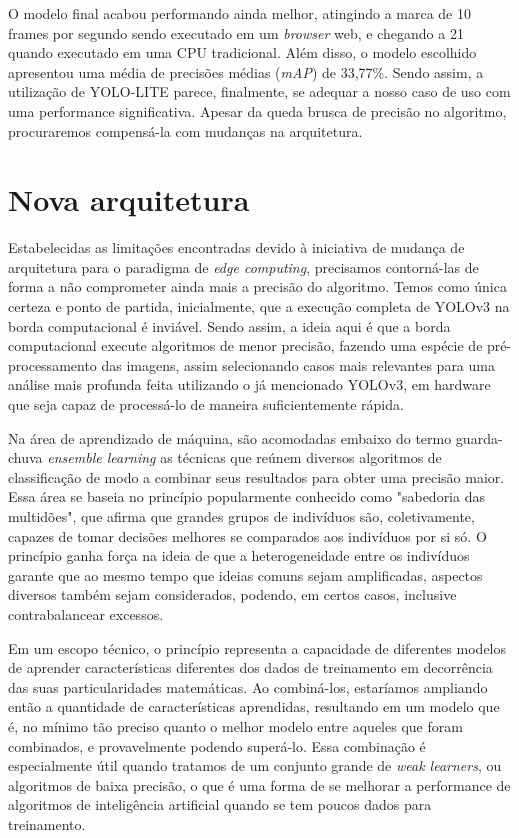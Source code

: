 \documentclass[]{politex}
\begin{document}
O modelo final acabou performando ainda melhor, atingindo a marca de 10 frames por segundo sendo executado em um \textit{browser} web, e chegando a 21 quando executado em uma CPU tradicional. Além disso, o modelo escolhido apresentou uma média de precisões médias (\textit{mAP}) de 33,77\%. Sendo assim, a utilização de YOLO-LITE parece, finalmente, se adequar a nosso caso de uso com uma performance significativa. Apesar da queda brusca de precisão no algoritmo, procuraremos compensá-la com mudanças na arquitetura.

\section{Nova arquitetura}

Estabelecidas as limitações encontradas devido à iniciativa de mudança de arquitetura para o paradigma de \textit{edge computing}, precisamos contorná-las de forma a não comprometer ainda mais a precisão do algoritmo. Temos como única certeza e ponto de partida, inicialmente, que a execução completa de YOLOv3 na borda computacional é inviável. Sendo assim, a ideia aqui é que a borda computacional execute algoritmos de menor precisão, fazendo uma espécie de pré-processamento das imagens, assim selecionando casos mais relevantes para uma análise mais profunda feita utilizando o já mencionado YOLOv3, em hardware que seja capaz de processá-lo de maneira suficientemente rápida.

Na área de aprendizado de máquina, são acomodadas embaixo do termo guarda-chuva \textit{ensemble learning} as técnicas que reúnem diversos algoritmos de classificação de modo a combinar seus resultados para obter uma precisão maior. Essa área se baseia no princípio popularmente conhecido como "sabedoria das multidões", que afirma que grandes grupos de indivíduos são, coletivamente, capazes de tomar decisões melhores se comparados aos indivíduos por si só. O princípio ganha força na ideia de que a heterogeneidade entre os indivíduos garante que ao mesmo tempo que ideias comuns sejam amplificadas, aspectos diversos também sejam considerados, podendo, em certos casos, inclusive contrabalancear excessos.

Em um escopo técnico, o princípio representa a capacidade de diferentes modelos de aprender características diferentes dos dados de treinamento em decorrência das suas particularidades matemáticas. Ao combiná-los, estaríamos ampliando então a quantidade de características aprendidas, resultando em um modelo que é, no mínimo tão preciso quanto o melhor modelo entre aqueles que foram combinados, e provavelmente podendo superá-lo. Essa combinação é especialmente útil quando tratamos de um conjunto grande de \textit{weak learners}, ou algoritmos de baixa precisão, o que é uma forma de se melhorar a performance de algoritmos de inteligência artificial quando se tem poucos dados para treinamento.
\end{document}
